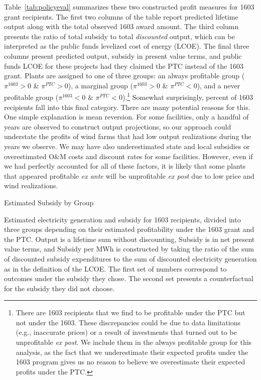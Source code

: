 \documentclass[12pt]{article}
\begin{document}
Table~\ref{tab:policyeval} summarizes these two constructed profit measures for 1603 grant recipients. The first two columns of the table report predicted lifetime output along with the total observed 1603 award amount. The third column presents the ratio of total subsidy to total \textit{discounted} output, which can be interpreted as the public funds levelized cost of energy (LCOE). The final three columns present predicted output, subsidy in present value terms, and public funds LCOE for these projects had they claimed the PTC instead of the 1603 grant. Plants are assigned to one of three groups: an always profitable group ($\pi^{1603}>0$ \& $\pi^{PTC}>0$), a marginal group ($\pi^{1603}>0$ \& $\pi^{PTC}<0$), and a never profitable group ($\pi^{1603}<0$ \& $\pi^{PTC}<0$).\footnote{There are 1603 recipients that we find to be profitable under the PTC but not under the 1603. These discrepancies could be due to data limitations (e.g., inaccurate prices) or a result of investments that turned out to be unprofitable \textit{ex post}. We include them in the always profitable group for this analysis, as the fact that we underestimate their expected profits under the 1603 program gives us no reason to believe we overestimate their expected profits under the PTC.} Somewhat surprisingly, percent of 1603 recipients fall into this final category. There are many potential reasons for this. One simple explanation is mean reversion. For some facilities, only a handful of years are observed to construct output projections, so our approach could understate the profits of wind farms that had low output realizations during the years we observe. We may have also underestimated state and local subsidies or overestimated O\&M costs and discount rates for some facilities. However, even if we had perfectly accounted for all of these factors, it is likely that some plants that appeared profitable \emph{ex ante} will be unprofitable \emph{ex post} due to low price and wind realizations.

\begin{table}[H]
\caption{Estimated Subsidy by Group\label{tab:policyeval}}

\vspace{-15pt}


\footnotesize

Estimated electricity generation and subsidy for 1603 recipients, divided into three groups depending on their estimated profitability under the 1603 grant and the PTC. Output is a lifetime sum without discounting, Subsidy is in net present value terms, and Subsidy per MWh is constructed by taking the ratio of the sum of discounted subsidy expenditures to the sum of discounted electricity generation as in the definition of the LCOE. The first set of numbers correspond to outcomes under the subsidy they chose. The second set presents a counterfactual for the subsidy they did not choose.
\end{table}
\end{document}
